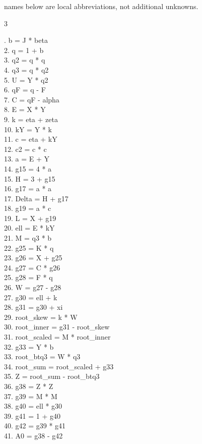\documentclass[10pt]{article}
\begin{document}
names below are local abbreviations, not additional unknowns.
\begin{multicols}{3}
\raggedright\ttfamily\fontsize{7.2}{8.4}. b = J * beta\\
2. q = 1 + b\\
3. q2 = q * q\\
4. q3 = q * q2\\
5. U = Y * q2\\
6. qF = q - F\\
7. C = qF - alpha\\
8. E = X * Y\\
9. k = eta + zeta\\
10. kY = Y * k\\
11. c = eta + kY\\
12. c2 = c * c\\
13. a = E + Y\\
14. g15 = 4 * a\\
15. H = 3 + g15\\
16. g17 = a * a\\
17. Delta = H + g17\\
18. g19 = a * c\\
19. L = X + g19\\
20. ell = E * kY\\
21. M = q3 * b\\
22. g25 = K * q\\
23. g26 = X + g25\\
24. g27 = C * g26\\
25. g28 = F * q\\
26. W = g27 - g28\\
27. g30 = ell + k\\
28. g31 = g30 + xi\\
29. root\_skew = k * W\\
30. root\_inner = g31 - root\_skew\\
31. root\_scaled = M * root\_inner\\
32. g33 = Y * b\\
33. root\_btq3 = W * q3\\
34. root\_sum = root\_scaled + g33\\
35. Z = root\_sum - root\_btq3\\
36. g38 = Z * Z\\
37. g39 = M * M\\
38. g40 = ell * g30\\
39. g41 = 1 + g40\\
40. g42 = g39 * g41\\
41. A0 = g38 - g42\\

\end{multicols}
\end{document}
